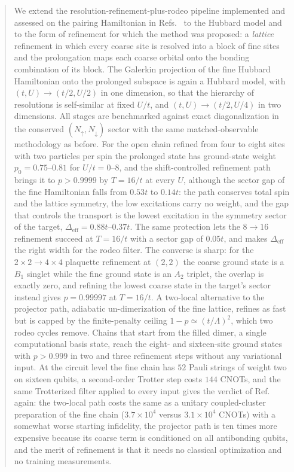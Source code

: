 \documentclass[
  aps,
  prc,
  reprint,
  superscriptaddress,
  floatfix,
  nofootinbib
]{revtex4-2}
\newcommand{\Deff}{\Delta_{\mathrm{eff}}}
\begin{document}
\begin{abstract}
We extend the resolution-refinement-plus-rodeo pipeline implemented and
assessed on the pairing Hamiltonian in Refs.~\cite{EigenQPairing2026,PHcompanion}
to the Hubbard model and to the form of refinement for which the method was
proposed: a \emph{lattice} refinement in which every coarse site is resolved
into a block of fine sites and the prolongation maps each coarse orbital onto
the bonding combination of its block.  The Galerkin projection of the fine
Hubbard Hamiltonian onto the prolonged subspace is again a Hubbard model, with
$(t,U)\to(t/2,U/2)$ in one dimension, so that the hierarchy of resolutions is
self-similar at fixed $U/t$, and $(t,U)\to(t/2,U/4)$ in two dimensions.  All
stages are benchmarked against exact diagonalization in the conserved
$(N_\uparrow,N_\downarrow)$ sector with the same matched-observable methodology
as before.  For the open chain refined from four to eight sites with two
particles per spin the prolonged state has ground-state weight
$p_0=0.75$--$0.81$ for $U/t=0$--$8$, and the shift-controlled refinement path
brings it to $p>0.9999$ by $T=16/t$ at every $U$, although the sector gap of
the fine Hamiltonian falls from $0.53t$ to $0.14t$: the path conserves total
spin and the lattice symmetry, the low excitations carry no weight, and the
gap that controls the transport is the lowest excitation in the symmetry sector
of the target, $\Deff=0.88t$--$0.37t$.  The same protection lets the
$8\to16$ refinement succeed at $T=16/t$ with a sector gap of $0.05t$, and makes
$\Deff$ the right width for the rodeo filter.  The converse is sharp: for the
$2\times2\to4\times4$ plaquette refinement at $(2,2)$ the coarse ground state
is a $B_1$ singlet while the fine ground state is an $A_2$ triplet, the overlap
is exactly zero, and refining the lowest coarse state in the target's sector
instead gives $p=0.99997$ at $T=16/t$.  A two-local alternative to the
projector path, adiabatic un-dimerization of the fine lattice, refines as fast
but is capped by the finite-penalty ceiling $1-p\simeq(t/\Lambda)^2$, which
two rodeo cycles remove.  Chains that start from the filled dimer, a single
computational basis state, reach the eight- and sixteen-site ground states
with $p>0.999$ in two and three refinement steps without any variational input.
At the circuit level the fine chain has $52$ Pauli strings of weight two on
sixteen qubits, a second-order Trotter step costs $144$ CNOTs, and the same
Trotterized filter applied to every input gives the verdict of
Ref.~\cite{EigenQPairing2026} again: the two-local path costs the same as a
unitary coupled-cluster preparation of the fine chain ($3.7\times10^4$ versus
$3.1\times10^4$ CNOTs) with a somewhat worse starting infidelity, the projector
path is ten times more expensive because its coarse term is conditioned on all
antibonding qubits, and the merit of refinement is that it needs no classical
optimization and no training measurements.
\end{abstract}
\end{document}
